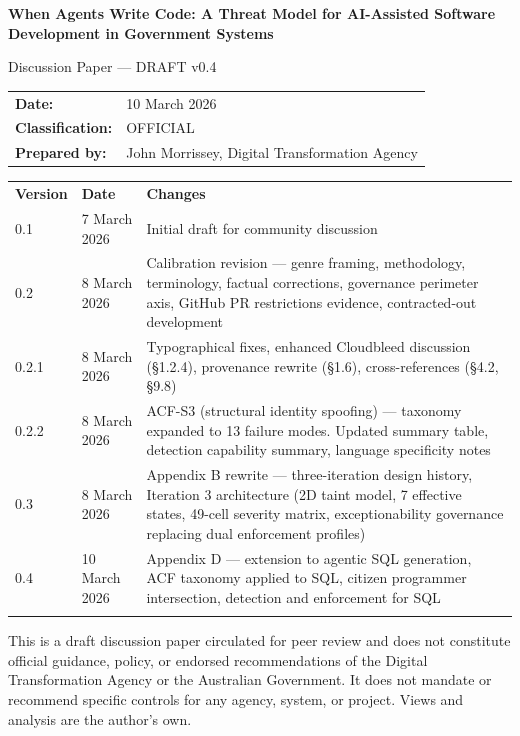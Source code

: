 \documentclass[a4paper,11pt]{report}
\renewcommand{\toprule}{\hline\noalign{\smallskip}}
\renewcommand{\midrule}{\noalign{\smallskip}\hline\noalign{\smallskip}}
\renewcommand{\bottomrule}{\noalign{\smallskip}\hline}
\begin{document}
\begin{titlepage}
\thispagestyle{titlepage}
\vspace*{1.5cm}

{\Huge\bfseries\color{dtanavy} When Agents Write Code: A Threat Model
for AI-Assisted Software Development in Government Systems\par}

\vspace{0.8cm}

{\Large Discussion Paper --- DRAFT v0.4\par}

\vspace{1cm}

\begin{tabular}{@{}ll@{}}
\textbf{Date:}            & 10 March 2026 \\
\textbf{Classification:}  & OFFICIAL \\
\textbf{Prepared by:}     & John Morrissey, Digital Transformation
Agency \\
\end{tabular}

\vspace{0.8cm}

{\small
\begin{tabular}{@{}llp{8cm}@{}}
\toprule
\textbf{Version} & \textbf{Date} & \textbf{Changes} \\
\midrule
0.1 & 7 March 2026 & Initial draft for community discussion \\
0.2 & 8 March 2026 & Calibration revision --- genre framing,
methodology, terminology, factual corrections, governance perimeter
axis, GitHub PR restrictions evidence, contracted-out development \\
0.2.1 & 8 March 2026 & Typographical fixes, enhanced Cloudbleed
discussion (§1.2.4), provenance rewrite (§1.6), cross-references (§4.2,
§9.8) \\
0.2.2 & 8 March 2026 & ACF-S3 (structural identity spoofing) ---
taxonomy expanded to 13 failure modes. Updated summary table, detection
capability summary, language specificity notes \\
0.3 & 8 March 2026 & Appendix B rewrite --- three-iteration design
history, Iteration 3 architecture (2D taint model, 7 effective states,
49-cell severity matrix, exceptionability governance replacing dual
enforcement profiles) \\
0.4 & 10 March 2026 & Appendix D --- extension to agentic SQL
generation, ACF taxonomy applied to SQL, citizen programmer
intersection, detection and enforcement for SQL \\
\bottomrule
\end{tabular}
}

\vfill

{\small\color{dtabody}
This is a draft discussion paper circulated for peer review and does not
constitute official guidance, policy, or endorsed recommendations of the
Digital Transformation Agency or the Australian Government. It does not
mandate or recommend specific controls for any agency, system, or
project. Views and analysis are the author's own.
}

\end{titlepage}
\end{document}
